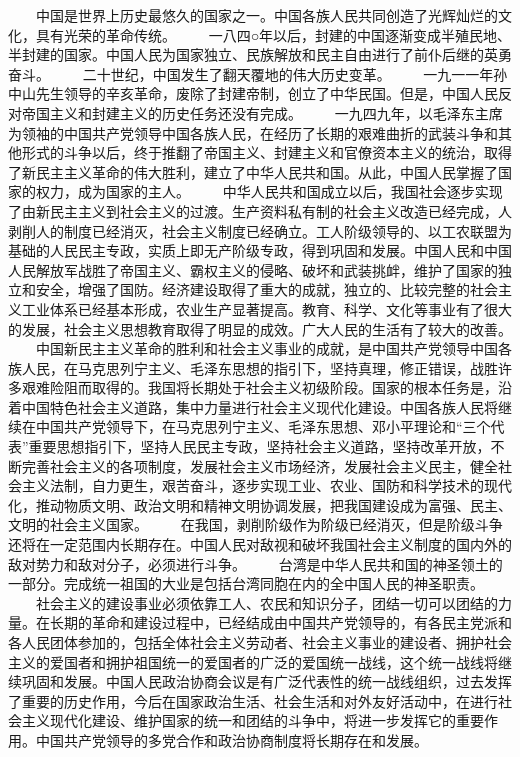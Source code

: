 　　中国是世界上历史最悠久的国家之一。中国各族人民共同创造了光辉灿烂的文化，具有光荣的革命传统。
 　　一八四○年以后，封建的中国逐渐变成半殖民地、半封建的国家。中国人民为国家独立、民族解放和民主自由进行了前仆后继的英勇奋斗。
　　二十世纪，中国发生了翻天覆地的伟大历史变革。
 　　一九一一年孙中山先生领导的辛亥革命，废除了封建帝制，创立了中华民国。但是，中国人民反对帝国主义和封建主义的历史任务还没有完成。
 　　一九四九年，以毛泽东主席为领袖的中国共产党领导中国各族人民，在经历了长期的艰难曲折的武装斗争和其他形式的斗争以后，终于推翻了帝国主义、封建主义和官僚资本主义的统治，取得了新民主主义革命的伟大胜利，建立了中华人民共和国。从此，中国人民掌握了国家的权力，成为国家的主人。
 　　中华人民共和国成立以后，我国社会逐步实现了由新民主主义到社会主义的过渡。生产资料私有制的社会主义改造已经完成，人剥削人的制度已经消灭，社会主义制度已经确立。工人阶级领导的、以工农联盟为基础的人民民主专政，实质上即无产阶级专政，得到巩固和发展。中国人民和中国人民解放军战胜了帝国主义、霸权主义的侵略、破坏和武装挑衅，维护了国家的独立和安全，增强了国防。经济建设取得了重大的成就，独立的、比较完整的社会主义工业体系已经基本形成，农业生产显著提高。教育、科学、文化等事业有了很大的发展，社会主义思想教育取得了明显的成效。广大人民的生活有了较大的改善。
 　　中国新民主主义革命的胜利和社会主义事业的成就，是中国共产党领导中国各族人民，在马克思列宁主义、毛泽东思想的指引下，坚持真理，修正错误，战胜许多艰难险阻而取得的。我国将长期处于社会主义初级阶段。国家的根本任务是，沿着中国特色社会主义道路，集中力量进行社会主义现代化建设。中国各族人民将继续在中国共产党领导下，在马克思列宁主义、毛泽东思想、邓小平理论和“三个代表”重要思想指引下，坚持人民民主专政，坚持社会主义道路，坚持改革开放，不断完善社会主义的各项制度，发展社会主义市场经济，发展社会主义民主，健全社会主义法制，自力更生，艰苦奋斗，逐步实现工业、农业、国防和科学技术的现代化，推动物质文明、政治文明和精神文明协调发展，把我国建设成为富强、民主、文明的社会主义国家。
 　　在我国，剥削阶级作为阶级已经消灭，但是阶级斗争还将在一定范围内长期存在。中国人民对敌视和破坏我国社会主义制度的国内外的敌对势力和敌对分子，必须进行斗争。
 　　台湾是中华人民共和国的神圣领土的一部分。完成统一祖国的大业是包括台湾同胞在内的全中国人民的神圣职责。
 　　社会主义的建设事业必须依靠工人、农民和知识分子，团结一切可以团结的力量。在长期的革命和建设过程中，已经结成由中国共产党领导的，有各民主党派和各人民团体参加的，包括全体社会主义劳动者、社会主义事业的建设者、拥护社会主义的爱国者和拥护祖国统一的爱国者的广泛的爱国统一战线，这个统一战线将继续巩固和发展。中国人民政治协商会议是有广泛代表性的统一战线组织，过去发挥了重要的历史作用，今后在国家政治生活、社会生活和对外友好活动中，在进行社会主义现代化建设、维护国家的统一和团结的斗争中，将进一步发挥它的重要作用。中国共产党领导的多党合作和政治协商制度将长期存在和发展。
